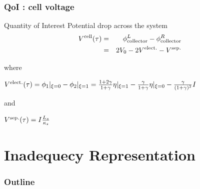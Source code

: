 \documentclass[10pt,xcolor=dvipsnames,compress]{beamer}
\begin{document}
\begin{frame}
\frametitle{QoI : cell voltage }
\vfill


\begin{alertblock}{Quantity of Interest}
 Potential drop across the system
 \begin{eqnarray*}
 V^{\rm cell}(\tau) &=& \phi_{\rm collector}^L - \phi_{\rm collector}^R \\
 		&=& 2V_0 - 2V^{\rm elect.} - V^{\rm sep.}
 \end{eqnarray*}

where 

$
V^{\rm elect.}(\tau) =  \phi_{\rm 1}|_{\xi=0} - \phi_{\rm 2}|_{\xi=1} = \frac{1+2\gamma}{1+\gamma}\eta|_{\xi=1} - \frac{\gamma}{1+\gamma}\eta|_{\xi=0} 
 - \frac{\gamma}{(1+\gamma)^2}I
$

and

$
V^{\rm sep.}(\tau) =  
I\frac{L_s}{\kappa_s}
$

\end{alertblock}



\vfill
\end{frame}



\section{Inadequecy Representation}
\begin{frame}
\frametitle{Outline}
\vfill

\vspace{0.7in}
\vspace{0.7in}

\vfill
\end{frame}
\end{document}
